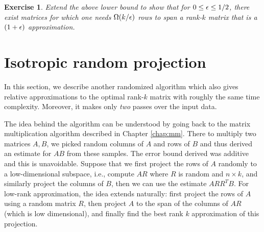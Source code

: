 \documentclass{book}
\newtheorem{exercise}{Exercise}
\numberwithin{exercise}{chapter}
\begin{document}
\begin{exercise}
Extend the above lower bound to show that for $0 \le \epsilon \le 1/2$, there exist matrices for which one needs $\Omega(k/\epsilon)$ rows to span a rank-$k$ matrix that is a $(1+\epsilon)$ approximation.
\end{exercise}

\section{Isotropic random projection}

In this section, we describe another randomized algorithm which also gives relative
approximations to the optimal rank-$k$ matrix with roughly the same time complexity.
Moreover, it makes only {\em two} passes over the input data.

The idea behind the algorithm can be understood by going back to the matrix
multiplication algorithm described in Chapter \ref{chap:mm}. There to multiply two
matrices $A, B$, we picked random columns of $A$ and rows of $B$ and thus derived an
estimate for $AB$ from these samples. The error bound derived was additive and this is
unavoidable. Suppose that we first project the rows of $A$ randomly to a low-dimensional
subspace, i.e., compute $AR$ where $R$ is random and $n \times k$, and similarly project
the columns of $B$, then we can use the estimate $ARR^TB$. For low-rank approximation, the
idea extends naturally: first project the rows of $A$ using a random matrix $R$, then
project $A$ to the span of the columns of $AR$ (which is low dimensional), and finally
find the best rank $k$ approximation of this projection.

\begin{center}
 \end{center}
\end{document}
